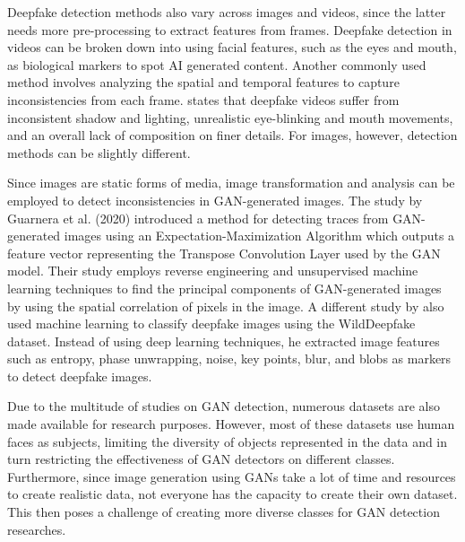 \documentclass{icsthesis}
\begin{document}
\begin{mainmatter}
\par Deepfake detection methods also vary across images and videos, since the latter needs more pre-processing to extract features from frames. Deepfake detection in videos can be broken down into using facial features, such as the eyes and mouth, as biological markers to spot AI generated content. Another commonly used method involves analyzing the spatial and temporal features to capture inconsistencies from each frame. \cite{detect-deepfake} states that deepfake videos suffer from inconsistent shadow and lighting, unrealistic eye-blinking and mouth movements, and an overall lack of composition on finer details. For images, however, detection methods can be slightly different.

\par Since images are static forms of media, image transformation and analysis can be employed to detect inconsistencies in GAN-generated images. The study by Guarnera et al. (2020) introduced a method for detecting traces from GAN-generated images using an Expectation-Maximization Algorithm which outputs a feature vector representing the Transpose Convolution Layer used by the GAN model. Their study employs reverse engineering and unsupervised machine learning techniques to find the principal components of GAN-generated images by using the spatial correlation of pixels in the image. A different study by \cite{ml-conrad} also used machine learning to classify deepfake images using the WildDeepfake dataset. Instead of using deep learning techniques, he extracted image features such as entropy, phase unwrapping, noise, key points, blur, and blobs as markers to detect deepfake images.  

\par Due to the multitude of studies on GAN detection, numerous datasets are also made available for research purposes. However, most of these datasets use human faces as subjects, limiting the diversity of objects represented in the data and in turn restricting the effectiveness of GAN detectors on different classes. Furthermore, since image generation using GANs take a lot of time and resources to create realistic data, not everyone has the capacity to create their own dataset. This then poses a challenge of creating more diverse classes for GAN detection researches.




\end{mainmatter}
\end{document}
